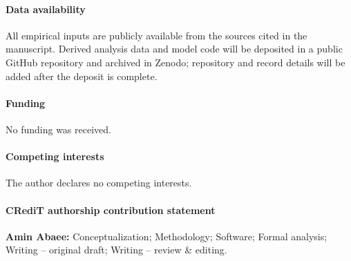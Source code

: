 \documentclass[preprint,12pt,authoryear]{elsarticle}
\begin{document}
\paragraph{Data availability} All empirical inputs are publicly available from the sources cited in the manuscript. Derived analysis data and model code will be deposited in a public GitHub repository and archived in Zenodo; repository and record details will be added after the deposit is complete.

\paragraph{Funding} No funding was received.

\paragraph{Competing interests} The author declares no competing interests.

\paragraph{CRediT authorship contribution statement} \textbf{Amin Abaee:} Conceptualization; Methodology; Software; Formal analysis; Writing -- original draft; Writing -- review \& editing.
\end{document}
